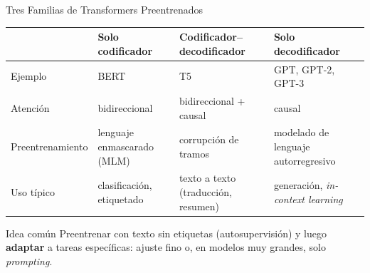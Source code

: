 \documentclass[aspectratio=169, 10pt]{beamer}
\begin{document}
\begin{frame}{Tres Familias de Transformers Preentrenados}
	\begin{center}
		\small
		\begin{tabular}{p{2.6cm}p{2.7cm}p{3.1cm}p{4.2cm}}
			\toprule
			& \textbf{Solo codificador} & \textbf{Codificador--decodificador} & \textbf{Solo decodificador}\\
			\midrule
			Ejemplo & BERT & T5 & GPT, GPT-2, GPT-3\\
			Atenci\'on & bidireccional & bidireccional + causal & causal\\
			Preentrenamiento & lenguaje enmascarado (MLM) & corrupci\'on de tramos & modelado de lenguaje autorregresivo\\
			Uso t\'ipico & clasificaci\'on, etiquetado & texto a texto (traducci\'on, resumen) & generaci\'on, \emph{in-context learning}\\
			\bottomrule
		\end{tabular}
	\end{center}
	\begin{block}{Idea com\'un}
		\small
		Preentrenar con texto sin etiquetas (autosupervisi\'on) y luego \textbf{adaptar} a tareas espec\'ificas: ajuste fino o, en modelos muy grandes, solo \emph{prompting}.
	\end{block}
\end{frame}
\end{document}
